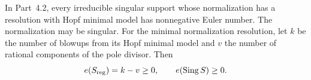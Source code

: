 
\begin{proposition}[P4R.8]\hypertarget{tag-02YK}{}\label{night:P4R.8}\label{stmt:P4R.8}


In Part~4.2, every irreducible singular support
whose normalization has a resolution with Hopf
minimal model has nonnegative Euler number.
The normalization may be singular. For the
minimal normalization resolution, let $k$ be
the number of blowups from its Hopf minimal
model and $v$ the number of rational components
of the pole divisor. Then
\[
 e(S_{\rm reg})=k-v\ge0,\qquad
 e(\operatorname{Sing}S)\ge0.
\]
\end{proposition}

